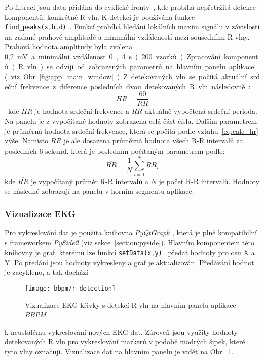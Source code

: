 Po filtraci jsou data přidána do cyklické fronty~\cite{circlebuffer}, kde
probíhá nepřetržitá detekce komponentů, konkrétně R vln. K detekci je používána
funkce \texttt{find{\_}peaks(x,h,d)}~\cite{scipyFindpeaks}. Funkcí probíhá
hledání lokálních maxim signálu v závislosti na zadané prahové amplitudě a
minimální vzdáleností mezi sousedními R vlny. Prahová hodnota amplitudy byla
zvolena 0,2~\si\mV~a minimální vzdálenost 0,4~\si\s~(200 vzorků).

Zpracování komponentů (R vln) se odvíjí od zobrazených parametrů na hlavním
panelu aplikace (viz Obr. \ref{fig:app_main_window}). Z detekovaných vln se
počítá aktuální srdeční frekvence z diference posledních dvou detekovaných R vln
následovně:
\begin{equation}
    \label{eq:calc_hr}
    HR = \frac{60}{RR}
\end{equation}
kde $HR$ je hodnota srdeční frekvence a $RR$ aktuálně vypočtená srdeční
perioda. Na panelu je z vypočítané hodnoty zobrazena celá část čísla. Dalším
parametrem je průměrná hodnota srdeční frekvence, která se počítá podle
vztahu~\ref{eq:calc_hr} výše. Namísto $RR$ je ale dosazena průměrná hodnota
všech R-R intervalů za posledních 6 sekund, která je posledním počítaným
parametrem podle:
\begin{equation}
    \overline{RR} = \frac{1}{N} \sum_{i=1}^N RR_i
\end{equation}
kde $\overline{RR}$ je vypočítaný průměr R-R intervalů a $N$ je počet R-R
intervalů. Hodnoty se následně zobrazují na panelu v horním segmentu aplikace.

\subsubsection{Vizualizace EKG}
\label{section:visual}
Pro vykreslování dat je použita knihovna \textit{PyQtGraph} \cite{PyQtGraph},
která je plně kompatibilní s frameworkem \textit{PySide2} (viz
sekce~\ref{section:pyside}). Hlavním komponentem této knihovny je graf, kterému
lze funkcí \texttt{setData(x,y)}~\cite{curveItem} předat hodnoty pro osu X a Y.
Po předání jsou hodnoty vykresleny a graf je aktualizován. Předávání hodnot je
zacykleno, a tak dochází
\begin{figure}[H]
    \begin{center}
        \texttt{[image: bbpm/r\_detection]}
        \caption{Vizualizace EKG křivky s detekcí R vln na hlavním panelu
        aplikace \textit{BBPM}}
        \label{fig:app_ecg_visual}
    \end{center}
\end{figure}
\noindent k neustálému vykreslování nových EKG dat. Zároveň jsou využity hodnoty
detekovaných R vln pro vykreslování markerů v podobě modrých šipek, které tyto
vlny označují. Vizualizace dat na hlavním panelu je vidět na
Obr.~\ref{fig:app_ecg_visual}.

